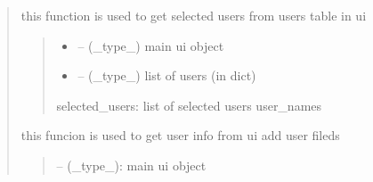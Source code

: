 \documentclass[letterpaper,10pt,english]{sphinxmanual}
\begin{document}
\begin{quote}

\begin{savenotes}\begin{fulllineitems}
\label{\detokenize{setting/backend/user_management_funcs:oxin.backend.user_management_funcs.get_selected_users}}
\pysigstartsignatures
{}
\pysigstopsignatures
\sphinxAtStartPar
this function is used to get selected users from users table in ui
\begin{quote}\begin{description}
\begin{itemize}
\item {} 
\sphinxAtStartPar
{} – (\_type\_) main ui object

\item {} 
\sphinxAtStartPar
{} – (\_type\_) list of users (in dict)

\end{itemize}

\sphinxAtStartPar
selected\_users: list of selected users user\_names

\end{description}\end{quote}

\end{fulllineitems}\end{savenotes}


\begin{savenotes}\begin{fulllineitems}
\label{\detokenize{setting/backend/user_management_funcs:oxin.backend.user_management_funcs.get_user_info_from_ui}}
\pysigstartsignatures
{}
\pysigstopsignatures
\sphinxAtStartPar
this funcion is used to get user info from ui add user fileds
\begin{quote}\begin{description}
\sphinxAtStartPar
{} – (\_type\_): main ui object


\end{description}
\end{quote}
\end{fulllineitems}
\end{savenotes}
\end{quote}
\end{document}
